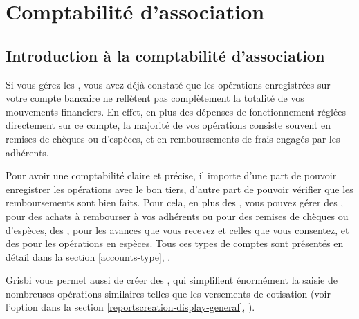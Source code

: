 

\chapter{Comptabilité d'association\label{association}}


\section{Introduction à la comptabilité d'association\label{association-intro}}


Si vous gérez les , vous avez déjà constaté que les opérations enregistrées sur votre compte bancaire ne reflètent pas complètement la totalité de vos mouvements financiers. En effet, en plus des dépenses de fonctionnement réglées directement sur ce compte, la majorité de vos opérations consiste souvent en remises de chèques ou d'espèces, et en remboursements de frais engagés par les adhérents. 

Pour avoir une comptabilité claire et précise, il importe d'une part de pouvoir enregistrer les opérations avec le bon tiers, d'autre part de pouvoir vérifier que les remboursements sont bien faits. Pour cela, en plus des , vous pouvez gérer des , pour des achats à rembourser à vos adhérents ou pour des remises de chèques ou d'espèces, des , pour les avances que vous recevez et celles que vous consentez, et des  pour les opérations en espèces. Tous ces types de comptes sont présentés en détail dans la section \vref{accounts-type}, . 

Grisbi vous permet aussi de créer des \og {} \fg{}, qui simplifient énormément la saisie de nombreuses opérations similaires telles que les versements de cotisation (voir l'option  dans la section \vref{reportscreation-display-general}, ).  


